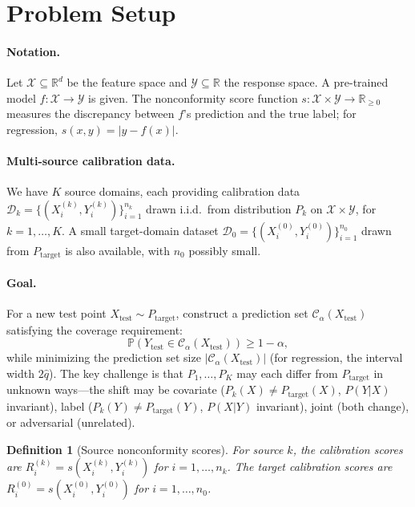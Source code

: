 \documentclass{article}
\newtheorem{definition}{Definition}
\newcommand{\Real}{\mathbb{R}}
\newcommand{\Prob}{\mathbb{P}}
\newcommand{\calX}{\mathcal{X}}
\newcommand{\calY}{\mathcal{Y}}
\newcommand{\calC}{\mathcal{C}}
\newcommand{\calD}{\mathcal{D}}
\newcommand{\qhat}{\widehat{q}}
\begin{document}
\section{Problem Setup}
\label{sec:setup}

\paragraph{Notation.}
Let $\calX \subseteq \Real^d$ be the feature space and $\calY \subseteq \Real$ the response space. A pre-trained model $f: \calX \to \calY$ is given. The nonconformity score function $s: \calX \times \calY \to \Real_{\geq 0}$ measures the discrepancy between $f$'s prediction and the true label; for regression, $s(x, y) = |y - f(x)|$.

\paragraph{Multi-source calibration data.}
We have $K$ source domains, each providing calibration data $\calD_k = \{(X_i^{(k)}, Y_i^{(k)})\}_{i=1}^{n_k}$ drawn i.i.d.\ from distribution $P_k$ on $\calX \times \calY$, for $k = 1, \ldots, K$. A small target-domain dataset $\calD_0 = \{(X_i^{(0)}, Y_i^{(0)})\}_{i=1}^{n_0}$ drawn from $P_{\text{target}}$ is also available, with $n_0$ possibly small.

\paragraph{Goal.}
For a new test point $X_{\text{test}} \sim P_{\text{target}}$, construct a prediction set $\calC_\alpha(X_{\text{test}})$ satisfying the coverage requirement:
\begin{equation}
\label{eq:coverage_goal}
\Prob\left(Y_{\text{test}} \in \calC_\alpha(X_{\text{test}})\right) \geq 1 - \alpha,
\end{equation}
while minimizing the prediction set size $|\calC_\alpha(X_{\text{test}})|$ (for regression, the interval width $2\qhat$). The key challenge is that $P_1, \ldots, P_K$ may each differ from $P_{\text{target}}$ in unknown ways---the shift may be covariate ($P_k(X) \neq P_{\text{target}}(X)$, $P(Y|X)$ invariant), label ($P_k(Y) \neq P_{\text{target}}(Y)$, $P(X|Y)$ invariant), joint (both change), or adversarial (unrelated).

\begin{definition}[Source nonconformity scores]
\label{def:scores}
For source $k$, the calibration scores are $R_i^{(k)} = s(X_i^{(k)}, Y_i^{(k)})$ for $i = 1, \ldots, n_k$. The target calibration scores are $R_i^{(0)} = s(X_i^{(0)}, Y_i^{(0)})$ for $i = 1, \ldots, n_0$.
\end{definition}
\end{document}
